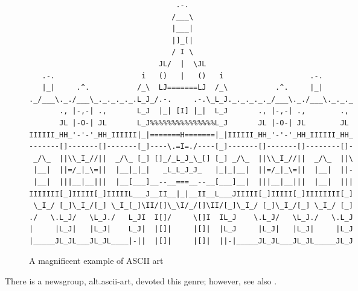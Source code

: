 \begin{figure*}
    \begin{shaded}
        \begin{verbatim}
                                  .-.
                                 /___\
                                 |___|
                                 |]_[|
                                 / I \
                              JL/  |  \JL
   .-.                    i   ()   |   ()   i                    .-.
   |_|     .^.           /_\  LJ=======LJ  /_\           .^.     |_|
._/___\._./___\_._._._._.L_J_/.-.     .-.\_L_J._._._._._/___\._./___\._._._
       ., |-,-| .,       L_J  |_| [I] |_|  L_J       ., |-,-| .,        .,
       JL |-O-| JL       L_J%%%%%%%%%%%%%%%L_J       JL |-O-| JL        JL
IIIIII_HH_'-'-'_HH_IIIIII|_|=======H=======|_|IIIIII_HH_'-'-'_HH_IIIIII_HH_
-------[]-------[]-------[_]----\.=I=./----[_]-------[]-------[]--------[]-
 _/\_  ||\\_I_//||  _/\_ [_] []_/_L_J_\_[] [_] _/\_  ||\\_I_//||  _/\_  ||\
 |__|  ||=/_|_\=||  |__|_|_|   _L_L_J_J_   |_|_|__|  ||=/_|_\=||  |__|  ||-
 |__|  |||__|__|||  |__[___]__--__===__--__[___]__|  |||__|__|||  |__|  |||
IIIIIII[_]IIIII[_]IIIIIL___J__II__|_|__II__L___JIIIII[_]IIIII[_]IIIIIIII[_]
 \_I_/ [_]\_I_/[_] \_I_[_]\II/[]\_\I/_/[]\II/[_]\_I_/ [_]\_I_/[_] \_I_/ [_]
./   \.L_J/   \L_J./   L_JI  I[]/     \[]I  IL_J    \.L_J/   \L_J./   \.L_J
|     |L_J|   |L_J|    L_J|  |[]|     |[]|  |L_J     |L_J|   |L_J|     |L_J
|_____JL_JL___JL_JL____|-||  |[]|     |[]|  ||-|_____JL_JL___JL_JL_____JL_J\end{verbatim}
    \end{shaded}
    \caption{A magnificent example of ASCII art}
    \label{figure:ascii-art:5}
\end{figure*}

There is a newsgroup, alt.ascii-art, devoted this genre; however, see also 
.


